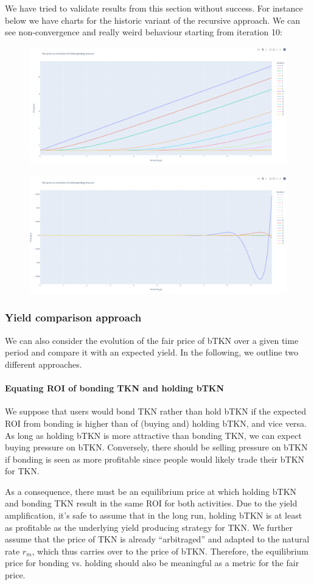 \documentclass{article}
\begin{document}
We have tried to validate results from this section without success. For instance below we have charts for the historic variant of the recursive approach. We can see non-convergence and really weird behaviour starting from iteration 10:

\begin{figure}
    \centering
    \includegraphics[width=0.5\linewidth]{./ChickenBonds_Whitepaper_recursive_price_1.png}
\end{figure}

\begin{figure}
    \centering
    \includegraphics[width=0.5\linewidth]{./ChickenBonds_Whitepaper_recursive_price_2.png}
\end{figure}

\subsubsection{Yield comparison approach}
We can also consider the evolution of the fair price of bTKN over a given time period and compare it with an expected yield. In the following, we outline two different approaches.

\paragraph{Equating ROI of bonding TKN and holding bTKN}
We suppose that users would bond TKN rather than hold bTKN if the expected ROI from bonding is higher than of (buying and) holding bTKN, and vice versa. As long as holding bTKN is more attractive than bonding TKN, we can expect buying pressure on bTKN. Conversely, there should be selling pressure on bTKN if bonding is seen as more profitable since people would likely trade their bTKN for TKN. 

As a consequence, there must be an equilibrium price at which holding bTKN and bonding TKN result in the same ROI for both activities. Due to the yield amplification, it's safe to assume that in the long run, holding bTKN is at least as profitable as the underlying yield producing strategy for TKN. We further assume that the price of TKN is already “arbitraged” and adapted to the natural rate $r_m$, which thus carries over to the price of bTKN. Therefore, the equilibrium price for bonding vs. holding should also be meaningful as a metric for the fair price.
\end{document}

